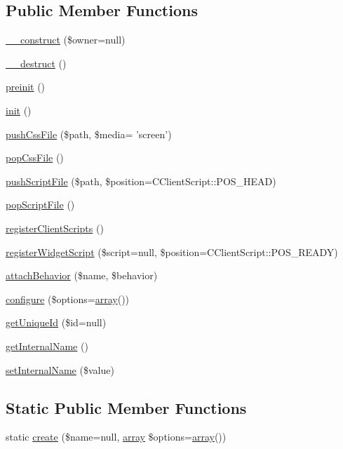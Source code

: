 \subsection*{Public Member Functions}
\begin{DoxyCompactItemize}
\item 
\hyperlink{classCPSWidget_adbfe8ea2bfbf717d6c5f17236251f1bc}{\_\-\_\-construct} (\$owner=null)
\item 
\hyperlink{classCPSWidget_a421831a265621325e1fdd19aace0c758}{\_\-\_\-destruct} ()
\item 
\hyperlink{classCPSWidget_a2dc262e99b1c246b56f27626bfe699ff}{preinit} ()
\item 
\hyperlink{classCPSWidget_a4be4055f3361d4800e16bc2e2e38cda6}{init} ()
\item 
\hyperlink{classCPSWidget_a563c3cfa2400bfb9cdb5af4777251d47}{pushCssFile} (\$path, \$media= 'screen')
\item 
\hyperlink{classCPSWidget_a836a112a31fa378be05d375ddf67a0c6}{popCssFile} ()
\item 
\hyperlink{classCPSWidget_a4589f8bb22c9e9837302ea2cc7c80570}{pushScriptFile} (\$path, \$position=CClientScript::POS\_\-HEAD)
\item 
\hyperlink{classCPSWidget_ab4b1e02bb3e8bab82c822ff04c43d12e}{popScriptFile} ()
\item 
\hyperlink{classCPSWidget_a59080ee7d7949e19f5af41e26ff53806}{registerClientScripts} ()
\item 
\hyperlink{classCPSWidget_a196225b59cf30535180836cdac821edb}{registerWidgetScript} (\$script=null, \$position=CClientScript::POS\_\-READY)
\item 
\hyperlink{classCPSWidget_ad93e793964a65dfac40131c7cf7fe901}{attachBehavior} (\$name, \$behavior)
\item 
\hyperlink{classCPSWidget_a00a75761a8790403ec39d56e44763ed5}{configure} (\$options=\hyperlink{list_8php_aa3205d038c7f8feb5c9f01ac4dfadc88}{array}())
\item 
\hyperlink{classCPSWidget_a54ebf4d8b63be34c7e54b579b97cc591}{getUniqueId} (\$id=null)
\item 
\hyperlink{classCPSWidget_aa18c8754403c04289ac8fbfc467df4ac}{getInternalName} ()
\item 
\hyperlink{classCPSWidget_a08e716b913e06fdbb77e84f81c0a3a35}{setInternalName} (\$value)
\end{DoxyCompactItemize}
\subsection*{Static Public Member Functions}
\begin{DoxyCompactItemize}
\item 
static \hyperlink{classCPSWidget_af09cbabc6ce2c1d9d9efb7ae308ea0f3}{create} (\$name=null, \hyperlink{list_8php_aa3205d038c7f8feb5c9f01ac4dfadc88}{array} \$options=\hyperlink{list_8php_aa3205d038c7f8feb5c9f01ac4dfadc88}{array}())
\end{DoxyCompactItemize}
